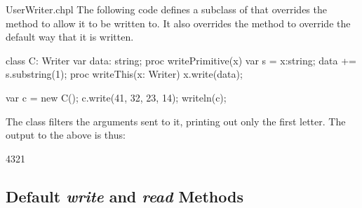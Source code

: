 \begin{chapelexample}{UserWriter.chpl}
The following code defines a subclass of  that overrides
the  method to allow it to be written to.  It also
overrides the  method to override the default way that
it is written.
\begin{chapel}
class C: Writer {
  var data: string;
  proc writePrimitive(x) {
    var s = x:string;
    data += s.substring(1);
  }
  proc writeThis(x: Writer) {
    x.write(data);
  }
}

var c = new C();
c.write(41, 32, 23, 14);
writeln(c);
\end{chapel}
The  class filters the arguments sent to it, printing out only
the first letter.  The output to the above is thus:
\begin{chapelprintoutput}
4321
\end{chapelprintoutput}
\end{chapelexample}






\subsection{Default {\em write} and {\em read} Methods}



